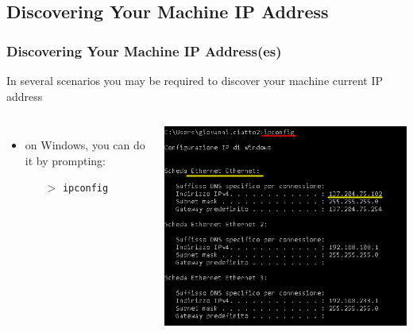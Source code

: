 \documentclass[presentation]{beamer}\mode<presentation>{\usetheme{AMSBolognaFC}}
\begin{document}
\subsection{Discovering Your Machine IP Address}

\begin{frame}[allowframebreaks]
\frametitle{Discovering Your Machine IP Address(es)}


    In several scenarios you may be required to discover your machine current IP address
    \begin{columns}

        \begin{itemize}
            \item on Windows, you can do it by prompting:
            \begin{itemize}
                \item[$>$] \texttt{ipconfig}
            \end{itemize}
        \end{itemize}
        \begin{center}
            \includegraphics[width=.9\linewidth]{figures/ipconfig.png}
        \end{center}



\end{columns}
\end{frame}
\end{document}
